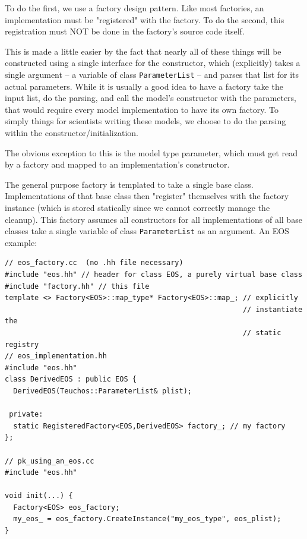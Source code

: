 To do the first, we use a factory design pattern. 
Like most factories, an implementation must be "registered" with the factory.  
To do the second, this registration must NOT be done in the factory's source code itself.

This is made a little easier by the fact that nearly all of these things
will be constructed using a single interface for the constructor, which
(explicitly) takes a single argument -- a variable of class {\tt ParameterList} -- and
parses that list for its actual parameters.  While it is usually a good
idea to have a factory take the input list, do the parsing, and call the
model's constructor with the parameters, that would require every model
implementation to have its own factory.  To simply things for scientists
writing these models, we choose to do the parsing within the
constructor/initialization.

The obvious exception to this is the model type parameter, which must get
read by a factory and mapped to an implementation's constructor.

The general purpose factory is templated to take a
single base class.  Implementations of that base class then "register"
themselves with the factory instance (which is stored statically since we
cannot correctly manage the cleanup).  This factory assumes all
constructors for all implementations of all base classes take a single
variable of class {\tt ParameterList} as an argument. 
An EOS example:
\begin{lstlisting}
// eos_factory.cc  (no .hh file necessary)
#include "eos.hh" // header for class EOS, a purely virtual base class
#include "factory.hh" // this file
template <> Factory<EOS>::map_type* Factory<EOS>::map_; // explicitly
                                                        // instantiate the
                                                        // static registry
// eos_implementation.hh
#include "eos.hh"
class DerivedEOS : public EOS {
  DerivedEOS(Teuchos::ParameterList& plist);

 private:
  static RegisteredFactory<EOS,DerivedEOS> factory_; // my factory
};

// pk_using_an_eos.cc
#include "eos.hh"

void init(...) {
  Factory<EOS> eos_factory;
  my_eos_ = eos_factory.CreateInstance("my_eos_type", eos_plist);
}
\end{lstlisting}



